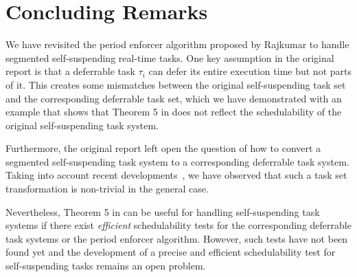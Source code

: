 \section{Concluding Remarks}

We have revisited the period enforcer algorithm proposed by Rajkumar \cite{Raj:suspension1991} to handle segmented self-suspending real-time tasks. One key assumption in the original report \cite{Raj:suspension1991} is that a deferrable task $\tau_i$ can defer its entire execution time but not parts of it. This creates some mismatches between the original self-suspending task set and the corresponding deferrable task set, which we have demonstrated with an example that shows that Theorem 5 in \cite{Raj:suspension1991} does not reflect the schedulability of the original self-suspending task system. 


Furthermore, the original report \cite{Raj:suspension1991} left open the question of how to convert a segmented self-suspending task system to a corresponding deferrable task system. Taking into account recent developments~\cite{ecrts15nelissen}, we have observed that such a task set transformation is non-trivial in the general case.  


Nevertheless, Theorem 5 in \cite{Raj:suspension1991} can be useful for handling self-suspending task systems if there exist \emph{efficient} schedulability tests for the corresponding deferrable task systems or the period enforcer algorithm. However, such tests have not been found yet and the development of a precise and efficient schedulability test for self-suspending tasks remains an open problem.

